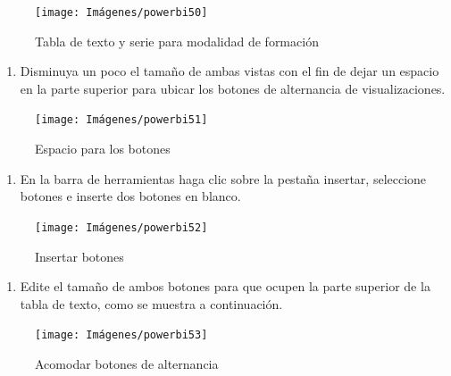 \documentclass[
]{book}
\providecommand{\tightlist}{%
  \setlength{\itemsep}{0pt}\setlength{\parskip}{0pt}}
\begin{document}
\begin{figure}

{\centering \texttt{[image: Imágenes/powerbi50]} 

}

\caption{Tabla de texto y serie para modalidad de formación}\label{fig:paso1alternancia-fig}
\end{figure}

\begin{enumerate}
\def\labelenumi{\arabic{enumi}.}
\setcounter{enumi}{1}
\tightlist
\item
  Disminuya un poco el tamaño de ambas vistas con el fin de dejar un espacio en la parte superior para ubicar los botones de alternancia de visualizaciones.
\end{enumerate}

\begin{figure}

{\centering \texttt{[image: Imágenes/powerbi51]} 

}

\caption{Espacio para los botones}\label{fig:paso2alternancia-fig}
\end{figure}

\begin{enumerate}
\def\labelenumi{\arabic{enumi}.}
\setcounter{enumi}{2}
\tightlist
\item
  En la barra de herramientas haga clic sobre la pestaña insertar, seleccione botones e inserte dos botones en blanco.
\end{enumerate}

\begin{figure}

{\centering \texttt{[image: Imágenes/powerbi52]} 

}

\caption{Insertar botones}\label{fig:paso3alternancia-fig}
\end{figure}

\begin{enumerate}
\def\labelenumi{\arabic{enumi}.}
\setcounter{enumi}{3}
\tightlist
\item
  Edite el tamaño de ambos botones para que ocupen la parte superior de la tabla de texto, como se muestra a continuación.
\end{enumerate}

\begin{figure}

{\centering \texttt{[image: Imágenes/powerbi53]} 

}

\caption{Acomodar botones de alternancia}\label{fig:paso4alternancia-fig}
\end{figure}
\end{document}
